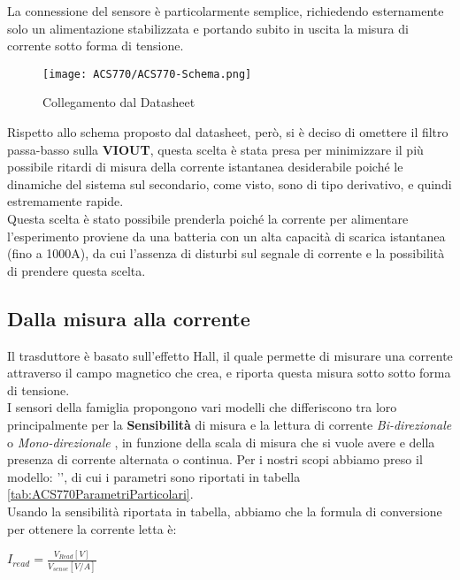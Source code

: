 La connessione del sensore è particolarmente semplice, richiedendo esternamente solo un alimentazione stabilizzata e portando subito in uscita la misura di corrente sotto forma di tensione.
\begin{figure}[H]
	\centering
	\caption[ Schema di collegamento dal Datasheet]{Collegamento dal Datasheet}
	\texttt{[image: ACS770/ACS770-Schema.png]}
\end{figure} \vspace{-8mm}
\noindent
Rispetto allo schema proposto dal datasheet, però, si è deciso di omettere il filtro passa-basso sulla \textbf{VIOUT}, questa scelta è stata presa per minimizzare il più possibile ritardi di misura della corrente istantanea desiderabile poiché le dinamiche del sistema sul secondario, come visto, sono di tipo derivativo, e quindi estremamente rapide.\\
Questa scelta è stato possibile prenderla poiché la corrente per alimentare l'esperimento proviene da una batteria con un alta capacità di scarica istantanea (fino a 1000A), da cui l'assenza di disturbi sul segnale di corrente e la possibilità di prendere questa scelta.

\subsection{Dalla misura alla corrente}
Il trasduttore è basato sull'effetto Hall, il quale permette di misurare una corrente attraverso il campo magnetico che crea, e riporta questa misura sotto sotto forma di tensione.\\
I sensori della famiglia \cite{ACS770} propongono vari modelli che differiscono tra loro principalmente per la \textbf{Sensibilità} di misura e la lettura di corrente \textit{Bi-direzionale} o \textit{Mono-direzionale} , in funzione della scala di misura che si vuole avere e della presenza di corrente alternata o continua.
Per i nostri scopi abbiamo preso il modello: '', di cui i parametri sono riportati in tabella \ref{tab:ACS770ParametriParticolari}.\\
Usando la sensibilità riportata in tabella, abbiamo che la formula di conversione per ottenere la corrente letta è:
{\large \begin{center}
	$I_{read} = \frac{V_{Read}[V]}{V_{sense}[V/A]}$
\end{center}
}


